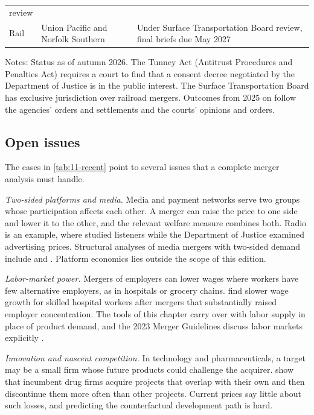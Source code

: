 \begin{table}[htbp]
\begin{threeparttable}
\begin{tabularx}{\textwidth}{@{}>{\raggedright\arraybackslash}p{2.9cm}>{\raggedright\arraybackslash}p{5.4cm}%
>{\raggedright\arraybackslash}X@{}}
review \\
\addlinespace
Rail & Union Pacific and Norfolk Southern & Under Surface Transportation Board review, final briefs due May 2027 \\
\bottomrule
\end{tabularx}
\begin{tablenotes}[flushleft]
\footnotesize
\item Notes: Status as of autumn 2026. The Tunney Act (Antitrust Procedures and Penalties Act) requires a court to find
that a consent decree negotiated by the Department of Justice is in the public interest. The Surface Transportation Board
has exclusive jurisdiction over railroad mergers. Outcomes from 2025 on follow the agencies' orders and settlements and
the courts' opinions and orders.
\end{tablenotes}
\end{threeparttable}
\end{table}

\subsection{Open issues}\label{sec:11-open}

The cases in \cref{tab:11-recent} point to several issues that a complete merger analysis must handle.

\emph{Two-sided platforms and media.} Media and payment networks serve two groups whose participation affects each
other. A merger can raise the price to one side and lower it to the other, and the relevant welfare measure combines
both. Radio is an example, where \citet{Sweeting2010} studied listeners while the Department of Justice examined
advertising prices. Structural analyses of media mergers with two-sided demand include \citet{ChandraCollardWexler2009}
and \citet{Jeziorski2014}. Platform economics lies outside the scope of this edition.

\emph{Labor-market power.} Mergers of employers can lower wages where workers have few alternative employers, as in
hospitals or grocery chains. \citet{PragerSchmitt2021} find slower wage growth for skilled hospital workers after
mergers that substantially raised employer concentration. The tools of this chapter carry over with labor supply in place
of product demand, and the 2023 Merger Guidelines discuss labor markets explicitly \citep{USDOJFTC2023}.

\emph{Innovation and nascent competition.} In technology and pharmaceuticals, a target may be a small firm whose future
products could challenge the acquirer. \citet{CunninghamEdererMa2021} show that incumbent drug firms acquire projects that
overlap with their own and then discontinue them more often than other projects. Current prices say little about such
losses, and predicting the counterfactual development path is hard.

